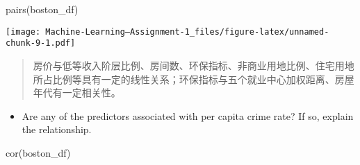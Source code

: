 \documentclass[
]{article}
\newenvironment{Shaded}{\begin{snugshade}}{\end{snugshade}}
\newcommand{\FunctionTok}[1]{\textcolor[rgb]{0.00,0.00,0.00}{#1}}
\newcommand{\NormalTok}[1]{#1}
\providecommand{\tightlist}{%
  \setlength{\itemsep}{0pt}\setlength{\parskip}{0pt}}
\begin{document}
\begin{Shaded}
\begin{Highlighting}[]
\FunctionTok{pairs}\NormalTok{(boston\_df)}
\end{Highlighting}
\end{Shaded}

\texttt{[image: Machine-Learning---Assignment-1\_files/figure-latex/unnamed-chunk-9-1.pdf]}

\begin{quote}
房价与低等收入阶层比例、房间数、环保指标、非商业用地比例、住宅用地所占比例等具有一定的线性关系；环保指标与五个就业中心加权距离、房屋年代有一定相关性。
\end{quote}

\begin{itemize}
\tightlist
\item
  Are any of the predictors associated with per capita crime rate? If
  so, explain the relationship.
\end{itemize}

\begin{Shaded}
\begin{Highlighting}[]
\FunctionTok{cor}\NormalTok{(boston\_df)}
\end{Highlighting}
\end{Shaded}
\end{document}

